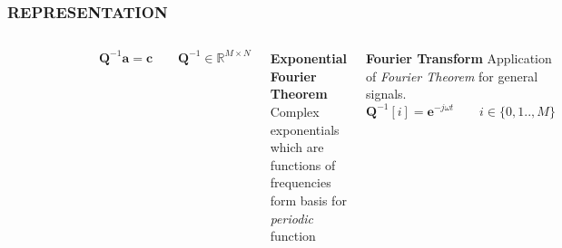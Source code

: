 \documentclass{beamer}
\begin{document}
\begin{frame}
\frametitle{REPRESENTATION}
\begin{columns}[c]
\begin{figure}
\includegraphics[width=\textwidth]{rep}
\end{figure}
\[
\textbf{Q}^{-1}\textbf{a} = \textbf{c} \qquad \textbf{Q}^{-1} \in \mathbb{R}^{M \times N}
\]
\begin{block}{\textbf{Exponential Fourier Theorem}}
Complex exponentials which are functions of frequencies form basis for \textit{periodic} function
\end{block}
\pause
\begin{block}{\textbf{Fourier Transform}}
Application of \textit{Fourier Theorem} for general signals.
\[
\textbf{Q}^{-1}[i] = \textbf{e}^{-j \omega t} \qquad i \in \{0,1..,M\}
\]
\end{block}
\end{columns}
\end{frame}
\end{document}

